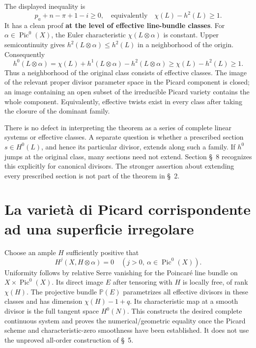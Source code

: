 The displayed inequality is
\begin{equation*}\label{cp2-ix-eq4}
p_a+n-\pi+1-i\geq0,
\quad\text{equivalently}\quad
\chi(L)-h^2(L)\geq1.
\tag{IX.4}
\end{equation*}
It has a clean proof \textbf{at the level of effective line-bundle classes}. For \(\alpha\in\operatorname{Pic}^0(X)\), the Euler characteristic \(\chi(L\otimes\alpha)\) is constant. Upper semicontinuity gives \(h^2(L\otimes\alpha)\leq h^2(L)\) in a neighborhood of the origin. Consequently
\[
h^0(L\otimes\alpha)
=\chi(L)+h^1(L\otimes\alpha)-h^2(L\otimes\alpha)
\geq\chi(L)-h^2(L)\geq1.
\]
Thus a neighborhood of the original class consists of effective classes. The image of the relevant proper divisor parameter space in the Picard component is closed; an image containing an open subset of the irreducible Picard variety contains the whole component. Equivalently, effective twists exist in every class after taking the closure of the dominant family.

There is no defect in interpreting the theorem as a series of complete linear systems or effective classes. A separate question is whether a prescribed section \(s\in H^0(L)\), and hence its particular divisor, extends along such a family. If \(h^0\) jumps at the original class, many sections need not extend. Section \S~8 recognizes this explicitly for canonical divisors. The stronger assertion about extending every prescribed section is not part of the theorem in \S~2.



\section{La varietà di Picard corrispondente ad una superficie irregolare}\label{cp2-ix-3}

Choose an ample \(H\) sufficiently positive that
\[
H^j(X,H\otimes\alpha)=0\quad(j>0,\ \alpha\in\operatorname{Pic}^0(X)).
\]
Uniformity follows by relative Serre vanishing for the Poincaré line bundle on \(X\times\operatorname{Pic}^0(X)\). Its direct image \(E\) after tensoring with \(H\) is locally free, of rank \(\chi(H)\). The projective bundle \(\mathbb P(E)\) parametrizes all effective divisors in these classes and has dimension \(\chi(H)-1+q\). Its characteristic map at a smooth divisor is the full tangent space \(H^0(N)\). This constructs the desired complete continuous system and proves the numerical/geometric equality once the Picard scheme and characteristic-zero smoothness have been established. It does not use the unproved all-order construction of \S~5.

